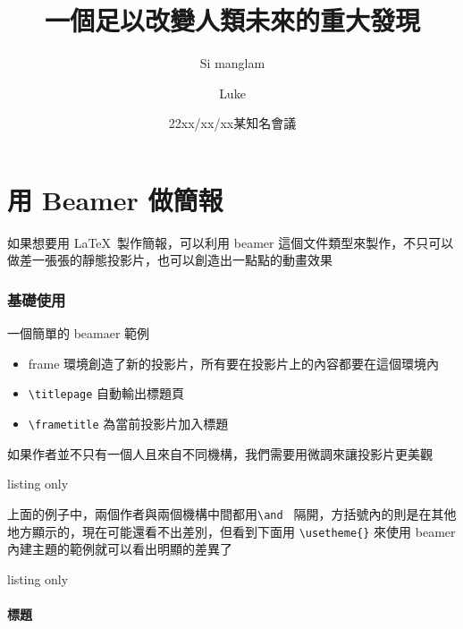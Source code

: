 \chapter{用 Beamer 做簡報}

如果想要用 \LaTeX\ 製作簡報，可以利用 beamer 這個文件類型來製作，不只可以做差一張張的靜態投影片，也可以創造出一點點的動畫效果

\subsection{基礎使用}

一個簡單的 beamaer 範例


\begin{itemize}
\item frame 環境創造了新的投影片，所有要在投影片上的內容都要在這個環境內
\item \verb`\titlepage` 自動輸出標題頁
\item \verb`\frametitle`	為當前投影片加入標題
\end{itemize}

如果作者並不只有一個人且來自不同機構，我們需要用微調來讓投影片更美觀

\begin{tcblisting}{listing only}
\title[重大發現]{一個足以改變人類未來的重大發現}
\author[Luke \& manglam]{Si manglam \and Luke}
\date[22xx 知名會議]{22xx/xx/xx某知名會議}
\end{tcblisting}

上面的例子中，兩個作者與兩個機構中間都用\verb`\and ` 隔開，方括號內的則是在其他地方顯示的，現在可能還看不出差別，但看到下面用 \verb`\usetheme{}` 來使用 beamer 內建主題的範例就可以看出明顯的差異了

\begin{tcblisting}{listing only}

\begin{frame}
\titlepage
\end{frame}
\begin{frame}
\frametitle{標題}
\end{frame}

\end{tcblisting}

